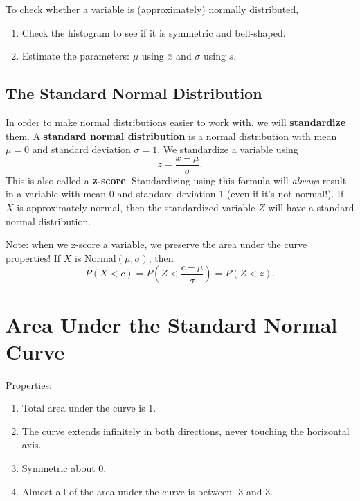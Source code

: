 \documentclass[
]{book}
\providecommand{\tightlist}{%
  \setlength{\itemsep}{0pt}\setlength{\parskip}{0pt}}
\begin{document}
To check whether a variable is (approximately) normally distributed,

\begin{enumerate}
\def\labelenumi{\arabic{enumi}.}
\tightlist
\item
  Check the histogram to see if it is symmetric and bell-shaped.
\item
  Estimate the parameters: \(\mu\) using \(\bar{x}\) and \(\sigma\) using \(s\).
\end{enumerate}

\hypertarget{the-standard-normal-distribution}{%
\subsection{The Standard Normal Distribution}\label{the-standard-normal-distribution}}

In order to make normal distributions easier to work with, we will \textbf{standardize} them. A \textbf{standard normal distribution} is a normal distribution with mean \(\mu=0\) and standard deviation \(\sigma=1\). We standardize a variable using \[z = \frac{x-\mu}{\sigma}.\] This is also called a \textbf{z-score}. Standardizing using this formula will \emph{always} result in a variable with mean 0 and standard deviation 1 (even if it's not normal!). If \(X\) is approximately normal, then the standardized variable \(Z\) will have a standard normal distribution.

Note: when we z-score a variable, we preserve the area under the curve properties! If \(X\) is Normal\((\mu,\sigma)\), then \[P(X < c) = P\left(Z < \frac{c - \mu}{\sigma}\right) = P(Z < z).\]

\hypertarget{area-under-the-standard-normal-curve}{%
\section{Area Under the Standard Normal Curve}\label{area-under-the-standard-normal-curve}}

Properties:

\begin{enumerate}
\def\labelenumi{\arabic{enumi}.}
\tightlist
\item
  Total area under the curve is 1.
\item
  The curve extends infinitely in both directions, never touching the horizontal axis.
\item
  Symmetric about 0.
\item
  Almost all of the area under the curve is between -3 and 3.
\end{enumerate}
\end{document}

